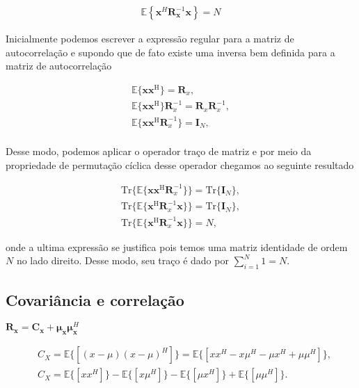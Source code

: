 \begin{align}
    \mathbb{E}\left\{\mathbf{x}^H \mathbf{R}_{\mathbf{x}}^{-1} \mathbf{x} \right\} = N
\end{align}



Inicialmente podemos escrever a expressão regular para a matriz de autocorrelação e supondo que de fato existe uma inversa bem definida 
para a matriz de autocorrelação

\begin{align}
    \mathbb{E}\{\mathbf{x} \mathbf{x}^{\text{H}}\} = \mathbf{R}_{x}, \\
    \mathbb{E}\{\mathbf{x} \mathbf{x}^{\text{H}}\}\mathbf{R}^{-1}_{x} = \mathbf{R}_{x}\mathbf{R}^{-1}_{x}, \\
    \mathbb{E}\{\mathbf{x} \mathbf{x}^{\text{H}}\mathbf{R}^{-1}_{x}\} = \mathbf{I}_{N}, \\
\end{align}

Desse modo, podemos aplicar o operador traço de matriz e por meio da propriedade de permutação cíclica desse operador chegamos ao seguinte resultado

\begin{align}
    \text{Tr}\{\mathbb{E}\{\mathbf{x} \mathbf{x}^{\text{H}}\mathbf{R}^{-1}_{x}\}\} = \text{Tr}\{\mathbf{I}_{N}\}, \\
    \text{Tr}\{\mathbb{E}\{\mathbf{x}^{\text{H}}\mathbf{R}^{-1}_{x} \mathbf{x}\}\} = \text{Tr}\{\mathbf{I}_{N}\}, \\
    \text{Tr}\{\mathbb{E}\{\mathbf{x}^{\text{H}}\mathbf{R}^{-1}_{x} \mathbf{x}\}\} = N,
\end{align}

onde a ultima expressão se justifica pois temos uma matriz identidade de ordem $N$ no lado direito. Desse modo, seu traço é dado por $\sum^{N}_{i = 1} 1 = N$.


\subsection{Covariância e correlação} %
 
 $\mathbf{R}_\mathbf{x} = \mathbf{C}_\mathbf{x} + {\mathbf{\mu}}_{\mathbf{x}}{\mathbf{\mu}}_{\mathbf{x}}^H$    
    
\begin{align}
    &C_{X} = \mathbb{E}\{[(x - \mu)(x - \mu)^{H}]\} = \mathbb{E}\{[xx^{H} -x\mu^{H} - \mu x^{H} + \mu \mu^{H}]\}, \\
    &C_{X} = \mathbb{E}\{[xx^{H}]\} -\mathbb{E}\{[x\mu^{H}]\} - \mathbb{E}\{[\mu x^{H}]\} + \mathbb{E}\{[\mu \mu^{H}]\}.
\end{align}


